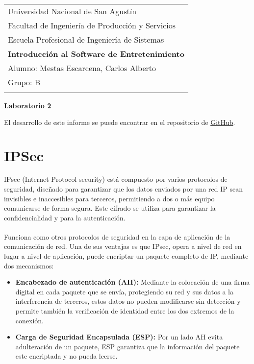 \documentclass[a4paper,12pt]{article}
\begin{document}
\thispagestyle{empty}

\begin{tabular}{p{15.5cm}} 
\large Universidad Nacional de San Agustín \\ 
\large Facultad de Ingeniería de Producción y Servicios \\
\large Escuela Profesional de Ingeniería de Sistemas \\
{\LARGE \bf Introducción al Software de Entretenimiento} \\
\vspace{1mm}
Alumno: Mestas Escarcena, Carlos Alberto \\
Grupo: B \\
\hline \\
\end{tabular} 

\begin{center} 
	{\LARGE \bf Laboratorio 2}
	\vspace{2mm}
\end{center}  

El desarrollo de este informe se puede encontrar en el repositorio de \textcolor{blue}{
    \href{https://github.com/CarlosMestas/TC_A_9_Carlos_Mestas}{GitHub}}.

\clearpage
\newpage







\section{IPSec}

\setlength{\parindent}{1em} IPsec (Internet Protocol security) está compuesto por varios protocolos de seguridad, diseñado para garantizar que los datos enviados por una red IP sean invisibles e inaccesibles para terceros, permitiendo a dos o más equipo comunicarse de forma segura. Este cifrado se utiliza para garantizar la confidencialidad y para la autenticación.
\\
\\
Funciona como otros protocolos de seguridad en la capa de aplicación de la comunicación de red. Una de sus ventajas es que IPsec, opera a nivel de red en lugar a nivel de aplicación, puede encriptar un paquete completo de IP, mediante dos mecanismos:

\begin{itemize}
    \item \textbf{Encabezado de autenticación (AH):} Mediante la colocación de una firma digital en cada paquete que se envía, protegiendo su red y sus datos a la interferencia de terceros, estos datos no pueden modificarse sin detección y permite también la verificación de identidad entre los dos extremos de la conexión.
    \item \textbf{Carga de Seguridad Encapsulada (ESP):} Por un lado AH evita adulteración de un paquete, ESP garantiza que la información del paquete este encriptada y no pueda leerse.
\end{itemize}
\end{document}
